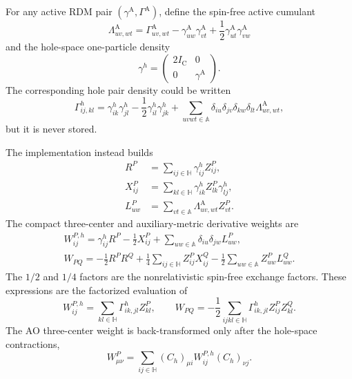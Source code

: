 \documentclass[aip,preprint,nofootinbib]{revtex4-1}
\newcommand{\core}{\mathrm{C}}
\newcommand{\act}{\mathrm{A}}
\begin{document}
For any active RDM pair $(\gamma^{\act},\Gamma^{\act})$, define the
spin-free active cumulant
\begin{equation}
 \Lambda^{\act}_{uv,wt}
 =\Gamma^{\act}_{uv,wt}
 -\gamma^{\act}_{uw}\gamma^{\act}_{vt}
 +\frac12\gamma^{\act}_{ut}\gamma^{\act}_{vw}
 \label{eq:nr-active-cumulant}
\end{equation}
and the hole-space one-particle density
\begin{equation}
 \gamma^h=
 \begin{pmatrix}2I_{\core}&0\\0&\gamma^{\act}\end{pmatrix}.
 \label{eq:nr-hole-1rdm}
\end{equation}
The corresponding hole pair density could be written
\begin{equation}
 \Gamma^h_{ij,kl}
 =\gamma^h_{ik}\gamma^h_{jl}
 -\frac12\gamma^h_{il}\gamma^h_{jk}
 +\sum_{uvwt\in\mathbb A}
 \delta_{iu}\delta_{jv}\delta_{kw}\delta_{lt}
 \Lambda^{\act}_{uv,wt},
 \label{eq:nr-hole-2rdm}
\end{equation}
but it is never stored.

The implementation instead builds
\begin{align}
 R^P&=\sum_{ij\in\mathbb H}\gamma^h_{ij}Z^P_{ij},
 \\
 X^P_{ij}
 &=\sum_{kl\in\mathbb H}\gamma^h_{ik}Z^P_{lk}\gamma^h_{lj},
 \\
 L^P_{uw}
 &=\sum_{vt\in\mathbb A}\Lambda^{\act}_{uv,wt}Z^P_{vt}.
 \label{eq:nr-rxl}
\end{align}
The compact three-center and auxiliary-metric derivative weights are
\begin{align}
 \boxed{
 W^{P,h}_{ij}
 =\gamma^h_{ij}R^P-\frac12X^P_{ij}
 +\sum_{uw\in\mathbb A}\delta_{iu}\delta_{jw}L^P_{uw}
 },
 \label{eq:nr-hole-w3}
 \\
 \boxed{
 W_{PQ}
 =-\frac12R^PR^Q
 +\frac14\sum_{ij\in\mathbb H}Z^P_{ij}X^Q_{ij}
 -\frac12\sum_{uw\in\mathbb A}Z^P_{uw}L^Q_{uw}
 }.
 \label{eq:nr-hole-w2}
\end{align}
The $1/2$ and $1/4$ factors are the nonrelativistic spin-free exchange
factors.  These expressions are the factorized evaluation of
\begin{equation}
 W^{P,h}_{ij}=\sum_{kl\in\mathbb H}\Gamma^h_{ik,jl}Z^P_{kl},
 \qquad
 W_{PQ}=-\frac12\sum_{ijkl\in\mathbb H}
 \Gamma^h_{ik,jl}Z^P_{ij}Z^Q_{kl}.
 \label{eq:nr-unfactorized-weights}
\end{equation}
The AO three-center weight is back-transformed only after the hole-space
contractions,
\begin{equation}
 W^P_{\mu\nu}=\sum_{ij\in\mathbb H}
 (C_h)_{\mu i}W^{P,h}_{ij}(C_h)_{\nu j}.
 \label{eq:nr-w3-backtransform}
\end{equation}
\end{document}
